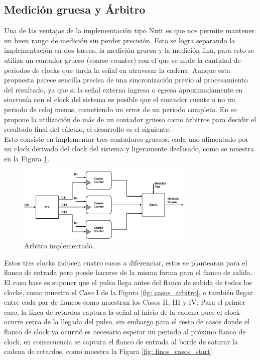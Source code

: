 \subsection{Medición gruesa y Árbitro}
Una de las ventajas de la implementación tipo Nutt es que nos permite mantener un buen rango de medición sin perder precisión. Esto se logra separando la implementación en dos tareas, 
la medición gruesa y la medición fina, para esto se utiliza un contador grueso (coarse counter) con el que se mide la cantidad de periodos de clocks que tarda la señal en atravesar la cadena.
Aunque esta propuesta parece sencilla precisa de una sincronización previo al procesamiento del resultado, ya que si la señal externa ingresa o egresa aproximadamente
en sincronía con el clock del sistema es posible que el contador cuente o no un periodo de reloj menos, cometiendo un error de un periodo completo.
En \cite{machado_novel_2018} se propone la utilización de más de un contador grueso como árbitros
para decidir el resultado final del cálculo, el desarrollo es el siguiente:\\

Esto consiste en implementar tres contadores gruesos, cada uno alimentado por un clock derivado del clock del sistema y ligeramente desfasado, como se muestra
en la Figura \ref{fig: arbitro}.
\begin{figure}[H]
     \centering
     \includegraphics[width=0.75\textwidth]{imagenes/arbiter.eps}
     \caption{Arbitro implementado.}
     \label{fig: arbitro}
\end{figure}

Estos tres clocks inducen cuatro casos a diferenciar, estos se plantearan
para el flanco de entrada pero
puede hacerse de la misma forma para el flanco de salida.\\
El caso base es suponer que el pulso llega antes del flanco de subida de todos los clocks,
como muestra el Caso I de la Figura \ref{fig: casos_arbitro}, o también llegar entre cada par de flancos como muestran los Casos II, III y IV.
Para el primer caso, la línea de retardos captura la señal al inicio de la cadena pues el clock ocurre cerca de la llegada del pulso, sin embargo
para el resto de casos donde el flanco de clock ya ocurrió es necesario esperar un periodo al próximo flanco de clock, en consecuencia se captura el flanco de entrada
al borde de saturar la cadena de retardos, como muestra la Figura \ref{fig: finos_casos_start}.\\

